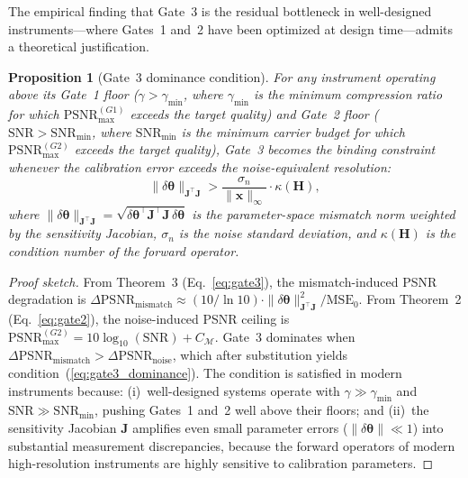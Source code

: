\documentclass[11pt]{article}
\newtheorem{proposition}[theorem]{Proposition}
\theoremstyle{definition}
\begin{document}
The empirical finding that Gate~3 is the residual bottleneck in well-designed instruments---where Gates~1 and~2 have been optimized at design time---admits a theoretical justification.

\begin{proposition}[Gate~3 dominance condition]
For any instrument operating above its Gate~1 floor ($\gamma > \gamma_{\min}$, where $\gamma_{\min}$ is the minimum compression ratio for which $\mathrm{PSNR}_{\max}^{(G1)}$ exceeds the target quality) and Gate~2 floor ($\mathrm{SNR} > \mathrm{SNR}_{\min}$, where $\mathrm{SNR}_{\min}$ is the minimum carrier budget for which $\mathrm{PSNR}_{\max}^{(G2)}$ exceeds the target quality), Gate~3 becomes the binding constraint whenever the calibration error exceeds the noise-equivalent resolution:
\begin{equation}
  \|\delta\boldsymbol{\theta}\|_{\mathbf{J}^\top\mathbf{J}}
  > \frac{\sigma_n}{\|\mathbf{x}\|_\infty} \cdot \kappa(\mathbf{H}),
  \label{eq:gate3_dominance}
\end{equation}
where $\|\delta\boldsymbol{\theta}\|_{\mathbf{J}^\top\mathbf{J}} = \sqrt{\delta\boldsymbol{\theta}^\top \mathbf{J}^\top\mathbf{J}\, \delta\boldsymbol{\theta}}$ is the parameter-space mismatch norm weighted by the sensitivity Jacobian, $\sigma_n$ is the noise standard deviation, and $\kappa(\mathbf{H})$ is the condition number of the forward operator.
\end{proposition}

\begin{proof}[Proof sketch]
From Theorem~3 (Eq.~\ref{eq:gate3}), the mismatch-induced PSNR degradation is
$\Delta\mathrm{PSNR}_{\mathrm{mismatch}} \approx (10/\ln 10) \cdot \|\delta\boldsymbol{\theta}\|_{\mathbf{J}^\top\mathbf{J}}^2 / \mathrm{MSE}_0$.
From Theorem~2 (Eq.~\ref{eq:gate2}), the noise-induced PSNR ceiling is
$\mathrm{PSNR}_{\max}^{(G2)} = 10\log_{10}(\mathrm{SNR}) + C_{\mathcal{M}}$.
Gate~3 dominates when $\Delta\mathrm{PSNR}_{\mathrm{mismatch}} > \Delta\mathrm{PSNR}_{\mathrm{noise}}$, which after substitution yields condition~(\ref{eq:gate3_dominance}). The condition is satisfied in modern instruments because: (i)~well-designed systems operate with $\gamma \gg \gamma_{\min}$ and $\mathrm{SNR} \gg \mathrm{SNR}_{\min}$, pushing Gates~1 and~2 well above their floors; and (ii)~the sensitivity Jacobian $\mathbf{J}$ amplifies even small parameter errors ($\|\delta\boldsymbol{\theta}\| \ll 1$) into substantial measurement discrepancies, because the forward operators of modern high-resolution instruments are highly sensitive to calibration parameters.
\end{proof}
\end{document}
